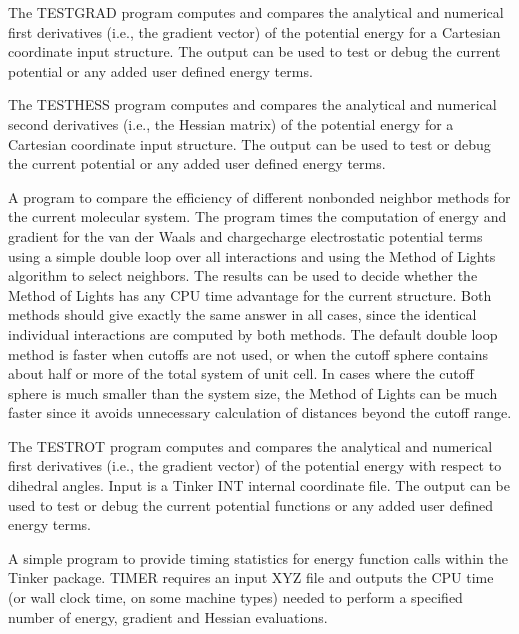 \documentclass[letterpaper,11pt,english]{sphinxmanual}
\begin{document}

The TESTGRAD program computes and compares the analytical and numerical first derivatives (i.e., the gradient vector) of the potential energy for a Cartesian coordinate input structure. The output can be used to test or debug the current potential or any added user defined energy terms.


The TESTHESS program computes and compares the analytical and numerical second derivatives (i.e., the Hessian matrix) of the potential energy for a Cartesian coordinate input structure. The output can be used to test or debug the current potential or any added user defined energy terms.


A program to compare the efficiency of different nonbonded neighbor methods for the current molecular system. The program times the computation of energy and gradient for the van der Waals and charge\sphinxhyphen{}charge electrostatic potential terms using a simple double loop over all interactions and using the Method of Lights algorithm to select neighbors. The results can be used to decide whether the Method of Lights has any CPU time advantage for the current structure. Both methods should give exactly the same answer in all cases, since the identical individual interactions are computed by both methods. The default double loop method is faster when cutoffs are not used, or when the cutoff sphere contains about half or more of the total system of unit cell. In cases where the cutoff sphere is much smaller than the system size, the Method of Lights can be much faster since it avoids unnecessary calculation of distances beyond the cutoff range.


The TESTROT program computes and compares the analytical and numerical first derivatives (i.e., the gradient vector) of the potential energy with respect to dihedral angles. Input is a Tinker INT internal coordinate file. The output can be used to test or debug the current potential functions or any added user defined energy terms.


A simple program to provide timing statistics for energy function calls within the Tinker package. TIMER requires an input XYZ file and outputs the CPU time (or wall clock time, on some machine types) needed to perform a specified number of energy, gradient and Hessian evaluations.
\end{document}
